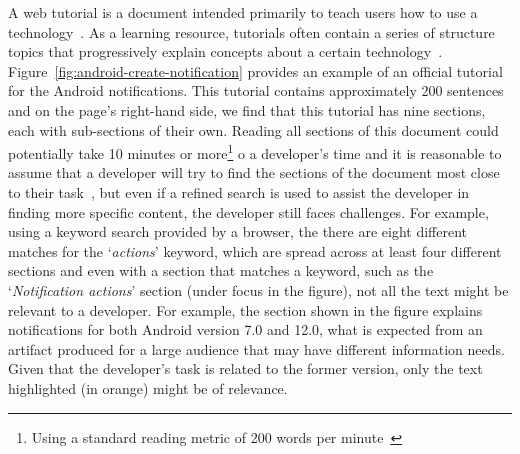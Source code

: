 A web tutorial is a document intended primarily to teach users how to use 
a technology~\cite{arya2020}. 
As a learning resource, tutorials often contain a series of structure topics 
that progressively explain concepts about a certain technology~\cite{Jiang2016b, Jiang2017}. 
Figure~\ref{fig:android-create-notification} provides an example 
of an official tutorial for the Android notifications. 
This tutorial contains  approximately 200 sentences
and on the page's right-hand side, we find that this tutorial
has nine sections, each with sub-sections of their own.  Reading all sections of this document could potentially 
take 10 minutes or more\footnote{Using a standard reading metric of 200 words per minute~\cite{Just1980}} o a developer's time 
and it is reasonable to assume that a 
developer will try to find the sections of the document
most close to their task~\cite{Li2013}, 
but even if a refined search is used to assist the developer 
in finding more specific content, the developer still faces challenges.
For example, using a keyword search provided by a browser, 
the there are eight different matches for the `\textit{actions}' keyword,
which are spread across at least four different sections 
and even with a section that matches a keyword, 
such as the `\textit{Notification actions}'
section (under focus in the figure), 
not all the text might be relevant to 
a developer.
For example, 
the section shown in the figure explains 
notifications for both Android version 7.0 and 12.0, what is expected from an artifact produced for a large audience
that may have different information needs.
Given that the developer's task is related to the former version,
only the text highlighted (in orange)
might be of relevance.





